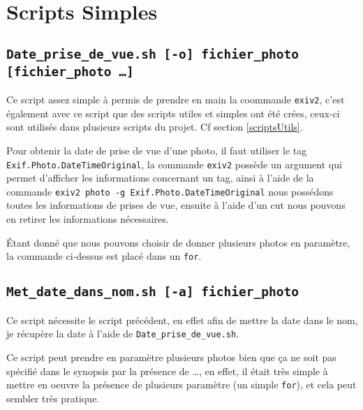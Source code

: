 \documentclass[a4paper, 11pt]{article}
\newcommand{\exiv}{\texttt{exiv2}}
\begin{document}
	\maketitle
	\section{Scripts Simples}
	\subsection{\texttt{Date\_prise\_de\_vue.sh [-o] fichier\_photo [fichier\_photo \ldots]}}
	Ce script assez simple à permis de prendre en main la coommande \texttt{exiv2}, c'est également avec ce script que des scripts utiles et simples ont été crées, 
	ceux-ci sont utilisés dans plusieurs scripts du projet. Cf section \ref{scriptsUtils}.

	Pour obtenir la date de prise de vue d'une photo, il faut utiliser le tag \texttt{Exif.Photo.DateTimeOriginal}, la commande \exiv{} possède un argument qui permet
	d'afficher les informations concernant un tag, ainsi à l'aide de la commande \texttt{exiv2 photo -g Exif.Photo.DateTimeOriginal} nous possédons 
	toutes les informations de prises de vue, ensuite à l'aide d'un cut nous pouvons en retirer les informations nécessaires.

	Étant donné que nous pouvons choisir de donner plusieurs photos en paramètre, la commande ci-dessus est placé dans un \texttt{for}.
	

	\subsection{\texttt{Met\_date\_dans\_nom.sh [-a] fichier\_photo}}
	Ce script nécessite le script précédent, en effet afin de mettre la date dans le nom, je récupère la date à l'aide de \texttt{Date\_prise\_de\_vue.sh}.

	Ce script peut prendre en paramètre plusieurs photos bien que ça ne soit pas spécifié dans le synopsis par la présence de \ldots, en effet, il était très 
	simple à mettre en oeuvre la présence de plusieurs paramètre (un simple \texttt{for}), et cela peut sembler très pratique.
	
\end{document}
